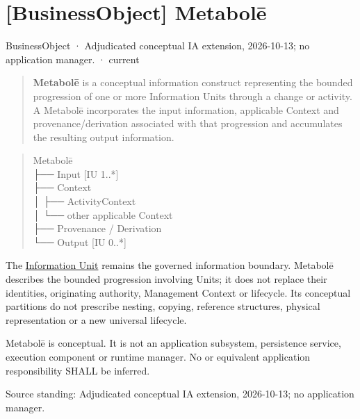 \section{[BusinessObject] Metabolē}

\label{element:c34b4929f71946708d37dbe6c1da920a}
{\small BusinessObject · Adjudicated conceptual IA extension, 2026-10-13; no application manager. · current}\par

\begin{quote}


\textbf{Metabolē} is a conceptual information construct representing the bounded
progression of one or more Information Units through a change or activity.
A Metabolē incorporates the input information, applicable Context and
provenance/derivation associated with that progression and accumulates the
resulting output information.



\end{quote}


\begin{quote}\small\ttfamily
Metabolē\\
 ├── Input       [IU 1..*]\\
 ├── Context\\
 │    ├── ActivityContext\\
 │    └── other applicable Context\\
 ├── Provenance / Derivation\\
 └── Output      [IU 0..*]\\

\end{quote}


The \hyperref[element:10284034c8534b639284386b064f2c54]{Information Unit}
remains the governed information boundary. Metabolē describes the bounded
progression involving Units; it does not replace their identities, originating
authority, Management Context or lifecycle. Its conceptual partitions do not
prescribe nesting, copying, reference structures, physical representation or a
new universal lifecycle.



Metabolē is conceptual. It is not an application subsystem, persistence service,
execution component or runtime manager. No \texttt{} or equivalent
application responsibility SHALL be inferred.



Source standing: Adjudicated conceptual IA extension, 2026-10-13; no application manager.


